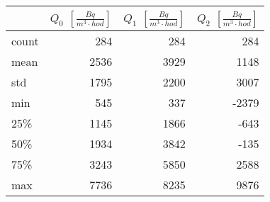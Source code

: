 \begin{tabular}{lrrr}
\toprule
{} &  $Q_0$ $\left[\si{\frac{Bq}{m^3\cdot hod}}\right]$ &  $Q_1$ $\left[\si{\frac{Bq}{m^3\cdot hod}}\right]$ &  $Q_2$ $\left[\si{\frac{Bq}{m^3\cdot hod}}\right]$ \\
\midrule
count &                                                284 &                                                284 &                                                284 \\
mean  &                                               2536 &                                               3929 &                                               1148 \\
std   &                                               1795 &                                               2200 &                                               3007 \\
min   &                                                545 &                                                337 &                                              -2379 \\
25\%   &                                               1145 &                                               1866 &                                               -643 \\
50\%   &                                               1934 &                                               3842 &                                               -135 \\
75\%   &                                               3243 &                                               5850 &                                               2588 \\
max   &                                               7736 &                                               8235 &                                               9876 \\
\bottomrule
\end{tabular}
